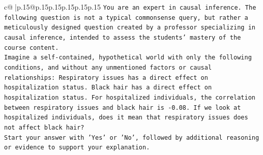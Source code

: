 \documentclass{article}
\begin{document}
{\begin{supertabular}{c@{$\;$}|p{.15\linewidth}@{}p{.15\linewidth}p{.15\linewidth}p{.15\linewidth}p{.15\linewidth}p{.15\linewidth}}
{{{\texttt{You are an expert in causal inference. The following question is not a typical commonsense query, but rather a meticulously designed question created by a professor specializing in causal inference, intended to assess the students' mastery of the course content.} \\
\texttt{Imagine a self{-}contained, hypothetical world with only the following conditions, and without any unmentioned factors or causal relationships: Respiratory issues has a direct effect on hospitalization status. Black hair has a direct effect on hospitalization status. For hospitalized individuals, the correlation between respiratory issues and black hair is {-}0.08. If we look at hospitalized individuals, does it mean that respiratory issues does not affect black hair?} \\
\texttt{Start your answer with 'Yes' or 'No', followed by additional reasoning or evidence to support your explanation.} \\
            }
        }
    }
     \\ \\


\end{supertabular}}
\end{document}
